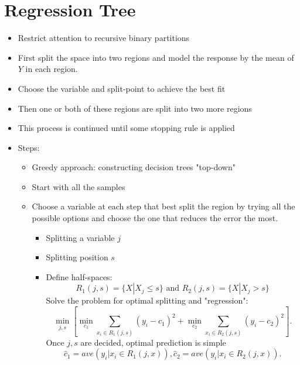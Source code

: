 \documentclass[twoside,12pt]{article}
\begin{document}
\section{Regression Tree}
\begin{itemize}
\item Restrict attention to recursive binary partitions 
\item First split the space into two regions and model the response by the mean of $Y$ in each region.
\item Choose the variable and split-point to achieve the best fit
\item Then one or both of these regions are split into two more regions
\item This process is continued until some stopping rule is applied 
\item Steps:
\begin{itemize}
\item Greedy approach: constructing decision trees "top-down"
\item Start with all the samples
\item Choose a variable at each step that best split the region by trying all the possible options and choose the one that reduces the error the most.
\begin{itemize}
\item Splitting a variable $j$
\item Splitting position $s$
\item Define half-spaces: $$R_1(j,s) = \{X | X_j \leq s\} \text{ and } R_2(j,s) = \{X | X_j > s\}$$
Solve the problem for optimal splitting and "regression":
$$\min_{j,s}[\min_{c_1} \sum_{x_i \in R_1(j,s)} (y_i - c_1)^2 +\min_{c_2} \sum_{x_i \in R_2(j,s)} (y_i - c_2)^2 ].$$
Once $j,s$ are decided, optimal prediction is simple 
$$\hat{c}_1 = ave(y_i|x_i \in R_1(j,x)), \hat{c}_2 = ave(y_i|x_i \in R_2(j,x)).$$
\end{itemize}
\end{itemize}
\end{itemize}
\end{document}
